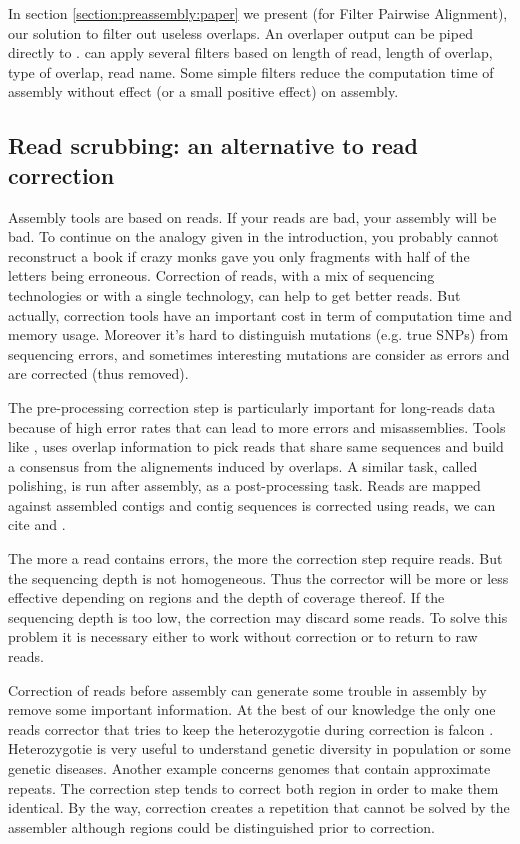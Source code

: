 \documentclass[main.tex]{subfiles}
\begin{document}
In section \ref{section:preassembly:paper} we present \fpa (for Filter Pairwise Alignment), our solution to filter out useless overlaps. An overlaper output can be piped directly to \fpa. \fpa can apply several filters based on length of read, length of overlap, type of overlap, read name. Some simple \fpa filters reduce the computation time of assembly without effect (or a small positive effect) on assembly.


\subsection{Read scrubbing: an alternative to read correction} \label{sec:preasm:intro_yacrd}

Assembly tools are based on reads. If your reads are bad, your assembly will be bad. To continue on the analogy given in the introduction, you probably cannot reconstruct a book if crazy monks gave you only fragments with half of the letters being erroneous. Correction of reads, with a mix of sequencing technologies or with a single technology, can help to get better reads. But actually, correction tools have an important cost in term of computation time and memory usage. Moreover it's hard to distinguish mutations (e.g. true SNPs) from sequencing errors, and sometimes interesting mutations are consider as errors and are corrected (thus removed).

The pre-processing correction step is particularly important for long-reads data because of high error rates that can lead to more errors and misassemblies. Tools like \cite{MECAT}, \cite{CONSENT} uses overlap information to pick reads that share same sequences and build a consensus from the alignements induced by overlaps. A similar task, called polishing, is run after assembly, as a post-processing task. Reads are mapped against assembled contigs and contig sequences is corrected using reads, we can cite \cite{racon} and .

The more a read contains errors, the more the correction step require reads. But the sequencing depth is not homogeneous. Thus the corrector will be more or less effective depending on regions and the depth of coverage thereof. If the sequencing depth is too low, the correction may discard some reads. To solve this problem it is necessary either to work without correction or to return to raw reads.

Correction of reads before assembly can generate some trouble in assembly by remove some important information. At the best of our knowledge the only one reads corrector that tries to keep the heterozygotie during correction is falcon \cite{falcon}. Heterozygotie is very useful to understand genetic diversity in population or some genetic diseases. Another example concerns genomes that contain approximate repeats. The correction step tends to correct both region in order to make them identical. By the way, correction creates a repetition that cannot be solved by the assembler although regions could be distinguished prior to correction.
\end{document}
